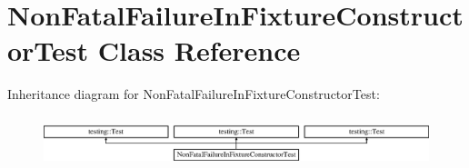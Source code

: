 \hypertarget{class_non_fatal_failure_in_fixture_constructor_test}{}\section{Non\+Fatal\+Failure\+In\+Fixture\+Constructor\+Test Class Reference}
\label{class_non_fatal_failure_in_fixture_constructor_test}
Inheritance diagram for Non\+Fatal\+Failure\+In\+Fixture\+Constructor\+Test\+:\begin{figure}[H]
\begin{center}
\leavevmode
\includegraphics[height=1.499331cm]{d6/dfa/class_non_fatal_failure_in_fixture_constructor_test}
\end{center}
\end{figure}
